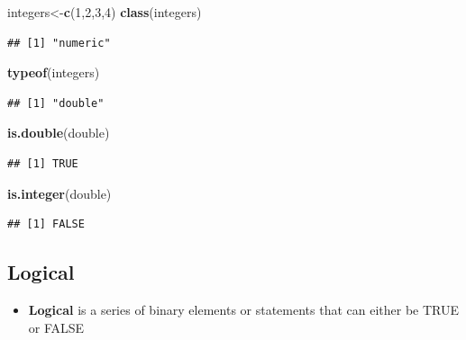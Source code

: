 \documentclass[]{book}
\newenvironment{Shaded}{\begin{snugshade}}{\end{snugshade}}
\newcommand{\KeywordTok}[1]{\textcolor[rgb]{0.13,0.29,0.53}{\textbf{#1}}}
\newcommand{\DecValTok}[1]{\textcolor[rgb]{0.00,0.00,0.81}{#1}}
\newcommand{\NormalTok}[1]{#1}
\providecommand{\tightlist}{%
  \setlength{\itemsep}{0pt}\setlength{\parskip}{0pt}}
\theoremstyle{definition}
\theoremstyle{definition}
\theoremstyle{definition}
\theoremstyle{remark}
\begin{document}
\begin{Shaded}
\begin{Highlighting}[]
\NormalTok{integers<-}\KeywordTok{c}\NormalTok{(}\DecValTok{1}\NormalTok{,}\DecValTok{2}\NormalTok{,}\DecValTok{3}\NormalTok{,}\DecValTok{4}\NormalTok{)}
\KeywordTok{class}\NormalTok{(integers)}
\end{Highlighting}
\end{Shaded}

\begin{verbatim}
## [1] "numeric"
\end{verbatim}

\begin{Shaded}
\begin{Highlighting}[]
\KeywordTok{typeof}\NormalTok{(integers)}
\end{Highlighting}
\end{Shaded}

\begin{verbatim}
## [1] "double"
\end{verbatim}

\begin{Shaded}
\begin{Highlighting}[]
\KeywordTok{is.double}\NormalTok{(double)}
\end{Highlighting}
\end{Shaded}

\begin{verbatim}
## [1] TRUE
\end{verbatim}

\begin{Shaded}
\begin{Highlighting}[]
\KeywordTok{is.integer}\NormalTok{(double)}
\end{Highlighting}
\end{Shaded}

\begin{verbatim}
## [1] FALSE
\end{verbatim}

\subsection{Logical}\label{logical}

\begin{itemize}
\tightlist
\item
  \textbf{Logical} is a series of binary elements or statements that can
  either be TRUE or FALSE
\end{itemize}
\end{document}
